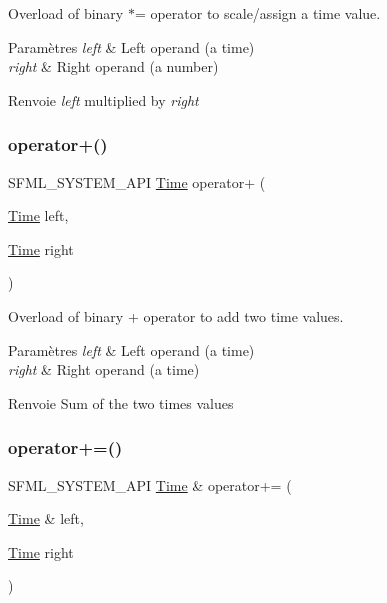Overload of binary $\ast$= operator to scale/assign a time value. 


\begin{DoxyParams}{Paramètres}
{\em left} & Left operand (a time) \\
\hline
{\em right} & Right operand (a number)\\
\hline
\end{DoxyParams}
\begin{DoxyReturn}{Renvoie}
{\itshape left} multiplied by {\itshape right} 
\end{DoxyReturn}
\mbox{\label{classsf_1_1Time_a7155e965f238f8c32d63649b0189ef47}} 
\subsubsection{\texorpdfstring{operator+()}{operator+()}}
{\footnotesize\ttfamily S\+F\+M\+L\+\_\+\+S\+Y\+S\+T\+E\+M\+\_\+\+A\+PI \hyperlink{classsf_1_1Time}{Time} operator+ (\begin{DoxyParamCaption}\item[{\hyperlink{classsf_1_1Time}{Time}}]{left,  }\item[{\hyperlink{classsf_1_1Time}{Time}}]{right }\end{DoxyParamCaption})\hspace{0.3cm}{\ttfamily [related]}}



Overload of binary + operator to add two time values. 


\begin{DoxyParams}{Paramètres}
{\em left} & Left operand (a time) \\
\hline
{\em right} & Right operand (a time)\\
\hline
\end{DoxyParams}
\begin{DoxyReturn}{Renvoie}
Sum of the two times values 
\end{DoxyReturn}
\mbox{\label{classsf_1_1Time_a831c8df4b7b9b47eaa0c5a52a1be654c}} 
\subsubsection{\texorpdfstring{operator+=()}{operator+=()}}
{\footnotesize\ttfamily S\+F\+M\+L\+\_\+\+S\+Y\+S\+T\+E\+M\+\_\+\+A\+PI \hyperlink{classsf_1_1Time}{Time} \& operator+= (\begin{DoxyParamCaption}\item[{\hyperlink{classsf_1_1Time}{Time} \&}]{left,  }\item[{\hyperlink{classsf_1_1Time}{Time}}]{right }\end{DoxyParamCaption})\hspace{0.3cm}{\ttfamily [related]}}



